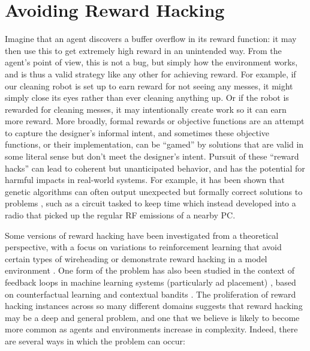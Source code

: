 \documentclass[a4paper,10pt]{article}
\begin{document}
\section{Avoiding Reward Hacking} \label{problem:RewardHacking}

Imagine that an agent discovers a buffer overflow in its reward function: it may then use this to get extremely high reward in an unintended way.  From the agent’s point of view, this is not a bug, but simply how the environment works, and is thus a valid strategy like any other for achieving reward.  For example, if our cleaning robot is set up to earn reward for not seeing any messes, it might simply close its eyes rather than ever cleaning anything up. Or if the robot is rewarded for cleaning messes, it may intentionally create work so it can earn more reward.  More broadly, formal rewards or objective functions are an attempt to capture the designer’s informal intent, and sometimes these objective functions, or their implementation, can be ``gamed'' by solutions that are valid in some literal sense but don’t meet the designer’s intent.  Pursuit of these ``reward hacks'' can lead to coherent but unanticipated behavior, and has the potential for harmful impacts in real-world systems.  For example, it has been shown that genetic algorithms can often output unexpected but formally correct solutions to problems \cite{thompson1997artificial,bird2002evolved}, such as a circuit tasked to keep time which instead developed into a radio that picked up the regular RF emissions of a nearby PC.

Some versions of reward hacking have been investigated from a theoretical perspective, with a focus on variations to reinforcement learning that avoid certain types of wireheading \cite{hibbard2012model,dewey2014reinforcement,everitt2016avoiding} or demonstrate reward hacking in a model environment \cite{ring2011delusion}.  One form of the problem has also been studied in the context of feedback loops in machine learning systems (particularly ad placement) \cite{bottou2012counterfactual,sculley2014machine}, based on counterfactual learning \cite{bottou2012counterfactual,swaminathan2015counterfactual} and contextual bandits \cite{agarwal2014taming}.  The proliferation of reward hacking instances across so many different domains suggests that reward hacking may be a deep and general problem, and one that we believe is likely to become more common as agents and environments increase in complexity. Indeed, there are several ways in which the problem can occur:
\end{document}
